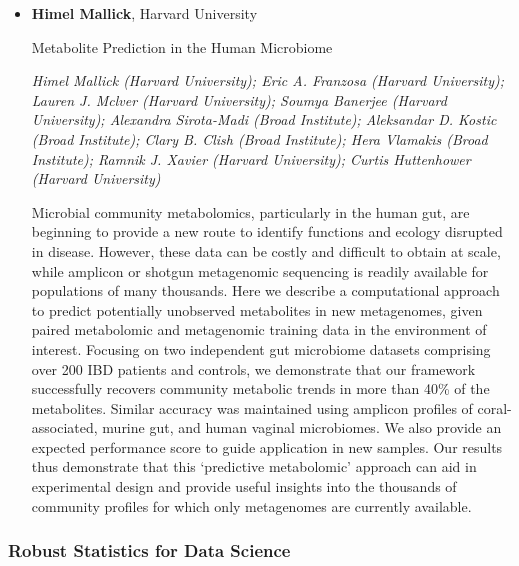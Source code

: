 \begin{itemize}
\item \textbf{Himel Mallick}, Harvard University

Metabolite Prediction in the Human Microbiome

\emph{\footnotesize Himel Mallick (Harvard University); Eric A. Franzosa (Harvard University); Lauren J. Mclver (Harvard University); Soumya Banerjee (Harvard University); Alexandra Sirota-Madi (Broad Institute); Aleksandar D. Kostic (Broad Institute); Clary B. Clish (Broad Institute); Hera Vlamakis (Broad Institute); Ramnik J. Xavier (Harvard University); Curtis Huttenhower (Harvard University)}

Microbial community metabolomics, particularly in the human gut, are beginning to provide a new route to identify functions and ecology disrupted in disease. However, these data can be costly and difficult to obtain at scale, while amplicon or shotgun metagenomic sequencing is readily available for populations of many thousands. Here we describe a computational approach to predict potentially unobserved metabolites in new metagenomes, given paired metabolomic and metagenomic training data in the environment of interest. Focusing on two independent gut microbiome datasets comprising over 200 IBD patients and controls, we demonstrate that our framework successfully recovers community metabolic trends in more than 40\% of the metabolites. Similar accuracy was maintained using amplicon profiles of coral-associated, murine gut, and human vaginal microbiomes. We also provide an expected performance score to guide application in new samples. Our results thus demonstrate that this ‘predictive metabolomic’ approach can aid in experimental design and provide useful insights into the thousands of community profiles for which only metagenomes are currently available.

\end{itemize}

\subsubsection*{Robust Statistics for Data Science}

